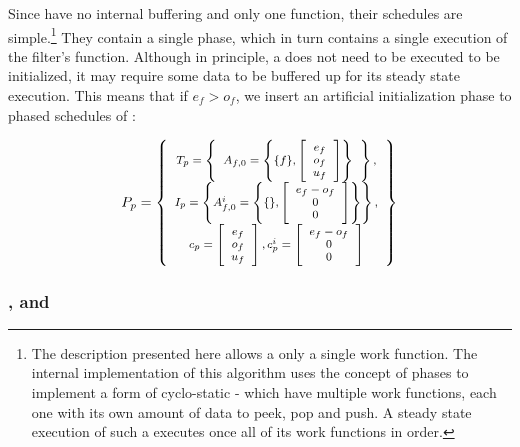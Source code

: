 Since {\filters} have no internal buffering and only one {\work}
function, their schedules are simple.\footnote{The description
presented here allows a {\filter} only a single work function. The
internal implementation of this algorithm uses the concept of
phases to implement a form of cyclo-static {\filters} - {\filters}
which have multiple work functions, each one with its own amount
of data to peek, pop and push. A steady state execution of such a
{\filter} executes once all of its work functions in order.} They
contain a single phase, which in turn contains a single execution
of the filter's {\work} function.  Although in principle, a
{\filter} does not need to be executed to be initialized, it may
require some data to be buffered up for its steady state
execution. This means that if $e_f > o_f$, we insert an artificial
initialization phase to phased schedules of {\filters}:

\begin{displaymath} \small
P_p = \left\{
\begin{array}{c}
T_p = \left\{
\begin{array}{c}
A_{f,0} = \left\{ \{f\}, \left[\begin{array}{c} e_f \\ o_f \\ u_f \end{array}\right]\right\} \\
\end{array}\right\}, \\
I_p = \left\{ A^i_{f,0} = \left\{ \{ \}, \left[\begin{array}{c}e_f - o_f \\ 0 \\ 0 \end{array}\right]\right\} \right\}, \\
c_p = \left[ \begin{array}{c} e_f \\ o_f \\ u_f \end{array}
\right], c^i_p = \left[ \begin{array}{c} e_f - o_f \\ 0 \\ 0
\end{array} \right]
\end{array}
\right\}
\end{displaymath}

\subsubsection{{\pipeline}, {\splitjoin} and {\feedbackloop}}

